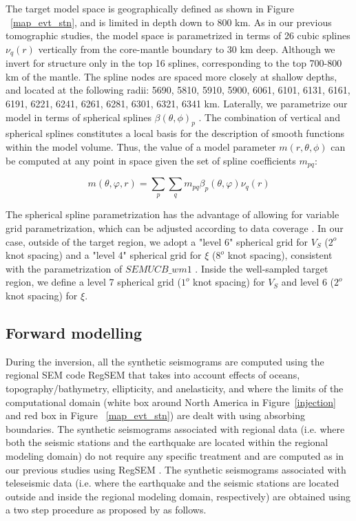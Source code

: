\documentclass[12pt]{article}
\begin{document}
The target model space is geographically defined as shown in Figure ~\ref{map_evt_stn}, and is limited in depth down to 800 km. 
As in our previous tomographic studies, the model space is parametrized in terms of 26 cubic splines $\nu_{q}(r)$ vertically \citep{megnin2000three} from the core-mantle boundary to 30 km deep. 
Although we invert for structure only in the top 16 splines, corresponding to the top 700-800 km of the mantle. 
The spline nodes are spaced more closely at shallow depths, and located at the following radii: 5690, 5810, 5910, 5900, 6061, 6101, 6131, 6161, 6191, 6221, 6241, 6261, 6281, 6301, 6321, 6341 km.  
Laterally, we parametrize our model in terms of spherical splines $\beta(\theta,\phi)_{p}$ \citep{wang1995spherical}. 
The combination of vertical and spherical splines constitutes a local basis for the description of smooth functions within the model volume. 
Thus, the value of a model parameter $m(r,\theta,\phi)$ can be computed at any point in space given the set of spline coefficients $m_{pq}$:

\begin{equation}
	m(\theta,\varphi,r) = \sum_{p}\sum_{q}m_{pq}\beta_{p}(\theta,\varphi)\nu_{q}(r)
\end{equation}

The spherical spline parametrization has the advantage of allowing for variable grid parametrization, which can be adjusted according to data coverage \citep[e.g.][]{marone2007three}. 
In our case, outside of the target region, we adopt a "level 6" spherical grid for $V_{S}$ ($2^{o}$ knot spacing) and a "level 4" spherical grid for $\xi$ ($8^{o}$ knot spacing), consistent with the parametrization of $SEMUCB\_wm1$ \citep{french2014whole}. 
Inside the well-sampled target region, we define a level 7 spherical grid ($1^{o}$ knot spacing) for $V_{S}$ and level 6 ($2^{o}$ knot spacing) for $\xi$. 

 \subsection{Forward modelling}

During the inversion, all the synthetic seismograms are computed using the regional SEM code RegSEM \citep{cupillard2012regsem} that takes into account effects of oceans, topography/bathymetry, ellipticity, and anelasticity, and where the limits of the computational domain (white box around North America in Figure~\ref{injection} and red box in Figure ~\ref{map_evt_stn}) are dealt with using absorbing boundaries. 
The synthetic seismograms associated with regional data (i.e. where both the seismic stations and the earthquake are located within the regional modeling domain) do not require any specific treatment and are computed as in our previous studies using RegSEM \citep[e.g.][]{yuan2014lithospheric}. 
The synthetic seismograms associated with teleseismic data (i.e. where the earthquake and the seismic stations are located outside and inside the regional modeling domain, respectively) are obtained using a two step procedure as proposed by \cite{masson2016box} as follows. 
\end{document}
